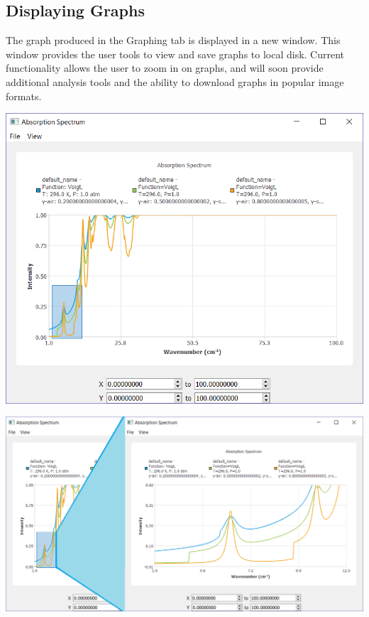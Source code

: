 \documentclass[a0,landscape]{a0poster}
\begin{document}
\begin{multicols}{3}
\subsection*{Displaying Graphs}
The graph produced in the Graphing tab is displayed in a new window. This window provides the user tools to view and save graphs to local disk. Current functionality allows the user to zoom in on graphs, and will soon provide additional analysis tools and the ability to download graphs in popular image formats. 
\begin{center}
\includegraphics[scale = 1.5]{GraphSelect.png}
\end{center}
\begin{center}
\includegraphics[scale = 1.2]{GraphDemo.png}
\end{center}


\end{multicols}
\end{document}
